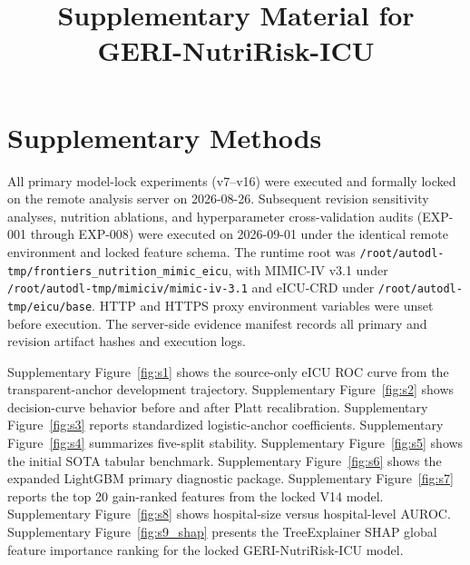 \documentclass[utf8]{frontiers_suppmat}
\begin{document}
\onecolumn
{}

\title[Supplementary Material]{\helveticaitalic Supplementary Material for\\ GERI-NutriRisk-ICU}

\maketitle

\section{Supplementary Methods}

All primary model-lock experiments (v7--v16) were executed and formally locked on the remote analysis server on 2026-08-26. Subsequent revision sensitivity analyses, nutrition ablations, and hyperparameter cross-validation audits (EXP-001 through EXP-008) were executed on 2026-09-01 under the identical remote environment and locked feature schema. The runtime root was \texttt{/root/}\allowbreak\texttt{autodl-tmp/}\allowbreak\texttt{frontiers\_}\allowbreak\texttt{nutrition\_}\allowbreak\texttt{mimic\_}\allowbreak\texttt{eicu}, with MIMIC-IV v3.1 under \texttt{/root/}\allowbreak\texttt{autodl-tmp/}\allowbreak\texttt{mimiciv/}\allowbreak\texttt{mimic-iv-3.1} and eICU-CRD under \texttt{/root/}\allowbreak\texttt{autodl-tmp/}\allowbreak\texttt{eicu/}\allowbreak\texttt{base}. HTTP and HTTPS proxy environment variables were unset before execution. The server-side evidence manifest records all primary and revision artifact hashes and execution logs.

Supplementary Figure~\ref{fig:s1} shows the source-only eICU ROC curve from the transparent-anchor development trajectory. Supplementary Figure~\ref{fig:s2} shows decision-curve behavior before and after Platt recalibration. Supplementary Figure~\ref{fig:s3} reports standardized logistic-anchor coefficients. Supplementary Figure~\ref{fig:s4} summarizes five-split stability. Supplementary Figure~\ref{fig:s5} shows the initial SOTA tabular benchmark. Supplementary Figure~\ref{fig:s6} shows the expanded LightGBM primary diagnostic package. Supplementary Figure~\ref{fig:s7} reports the top 20 gain-ranked features from the locked V14 model. Supplementary Figure~\ref{fig:s8} shows hospital-size versus hospital-level AUROC. Supplementary Figure~\ref{fig:s9_shap} presents the Tree\allowbreak Explainer SHAP global feature importance ranking for the locked GERI-NutriRisk-ICU model.
\end{document}
